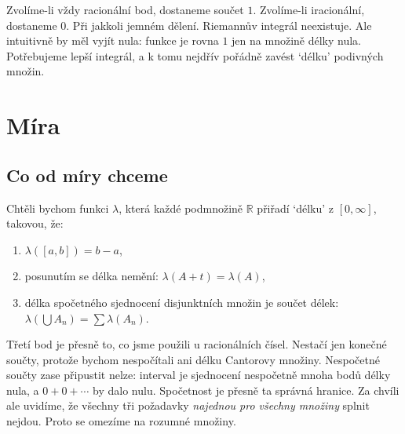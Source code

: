 \begin{center}
\end{center}

Zvolíme-li vždy racionální bod, dostaneme součet $1$. Zvolíme-li iracionální, dostaneme $0$. Při jakkoli jemném dělení. Riemannův integrál neexistuje. Ale intuitivně by měl vyjít nula: funkce je rovna $1$ jen na množině délky nula. Potřebujeme lepší integrál, a k tomu nejdřív pořádně zavést `délku' podivných množin.

\section{Míra}

\subsection{Co od míry chceme}

Chtěli bychom funkci $\lambda$, která každé podmnožině $\mathbb{R}$ přiřadí `délku' z $[0, \infty]$, takovou, že:
\begin{enumerate}
  \item $\lambda([a, b]) = b - a$,
  \item posunutím se délka nemění: $\lambda(A + t) = \lambda(A)$,
  \item délka spočetného sjednocení disjunktních množin je součet délek: $\lambda\left(\bigcup A_n\right) = \sum\lambda(A_n)$.
\end{enumerate}
Třetí bod je přesně to, co jsme použili u racionálních čísel. Nestačí jen konečné součty, protože bychom nespočítali ani délku Cantorovy množiny. Nespočetné součty zase připustit nelze: interval je sjednocení nespočetně mnoha bodů délky nula, a $0 + 0 + \cdots$ by dalo nulu. Spočetnost je přesně ta správná hranice. Za chvíli ale uvidíme, že všechny tři požadavky \textit{najednou pro všechny množiny} splnit nejdou. Proto se omezíme na rozumné množiny.

